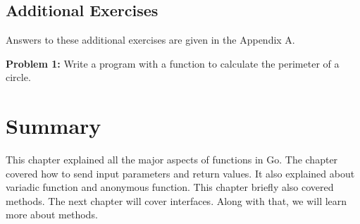 \subsection{Additional Exercises}

Answers to these additional exercises are given in the Appendix A.

\textbf{Problem 1:} Write a program with a function to calculate the perimeter of a circle.

\section*{Summary}

This chapter explained all the major aspects of functions in Go.  The
chapter covered how to send input parameters and return values.  It
also explained about variadic function and anonymous function.  This
chapter briefly also covered methods.  The next chapter will cover
interfaces.  Along with that, we will learn more about methods.
